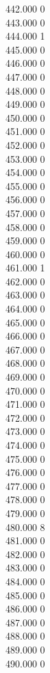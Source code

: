 { 442.000	0 \\
 443.000	0 \\
 444.000	1 \\
 445.000	0 \\
 446.000	0 \\
 447.000	0 \\
 448.000	0 \\
 449.000	0 \\
 450.000	0 \\
 451.000	0 \\
 452.000	0 \\
 453.000	0 \\
 454.000	0 \\
 455.000	0 \\
 456.000	0 \\
 457.000	0 \\
 458.000	0 \\
 459.000	0 \\
 460.000	0 \\
 461.000	1 \\
 462.000	0 \\
 463.000	0 \\
 464.000	0 \\
 465.000	0 \\
 466.000	0 \\
 467.000	0 \\
 468.000	0 \\
 469.000	0 \\
 470.000	0 \\
 471.000	0 \\
 472.000	0 \\
 473.000	0 \\
 474.000	0 \\
 475.000	0 \\
 476.000	0 \\
 477.000	0 \\
 478.000	0 \\
 479.000	0 \\
 480.000	8 \\
 481.000	0 \\
 482.000	0 \\
 483.000	0 \\
 484.000	0 \\
 485.000	0 \\
 486.000	0 \\
 487.000	0 \\
 488.000	0 \\
 489.000	0 \\
 490.000	0 \\
}
